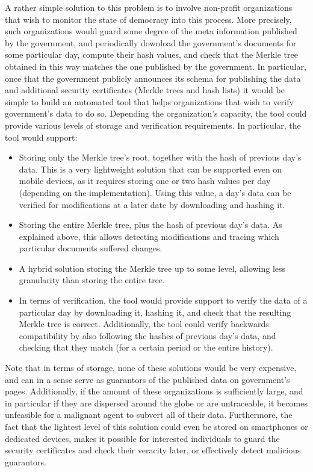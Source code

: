 A rather simple solution to this problem is to involve non-profit organizations that wish to monitor the state of democracy into this process. More precisely, such organizations would guard some degree of the meta information published by the government, and periodically download the government's documents for some particular day, compute their hash values, and check that the Merkle tree obtained in this way matches the one published by the government. In particular, once that the government publicly announces its schema for publishing the data and additional security certificates (Merkle trees and hash lists) it would be simple to build an automated tool that helps organizations that wish to verify government's data to do so. Depending the organization's capacity, the tool could provide various levels of storage and verification requirements. In particular, the tool would support:
\begin{itemize}
\item Storing only the Merkle tree's root, together with the hash of previous day's data. This is a very lightweight solution that can be supported even on mobile devices, as it requires storing one or two hash values per day (depending on the implementation). Using this value, a day's data can be verified for modifications at a later date by downloading and hashing it.
\item Storing the entire Merkle tree, plus the hash of previous day's data. As explained above, this allows detecting modifications and tracing which particular documents suffered changes.
\item A hybrid solution storing the Merkle tree up to some level, allowing less granularity than storing the entire tree.
\item In terms of verification, the tool would provide support to verify the data of a particular day by downloading it, hashing it, and check that the resulting Merkle tree is correct. Additionally, the tool could verify backwards compatibility by also following the hashes of previous day's data, and checking that they match (for a certain period or the entire history).
\end{itemize}

Note that in terms of storage, none of these solutions would be very expensive, and can in a sense serve as guarantors of the published data on government's pages. Additionally, if the amount of these organizations is sufficiently large, and in particular if they are dispersed around the globe or are untraceable, it becomes unfeasible for a malignant agent to subvert all of their data. Furthermore, the fact that the lightest level of this solution could even be stored on smartphones or dedicated devices, makes it possible for interested individuals to guard the security certificates and check their veracity later, or effectively detect malicious guarantors.